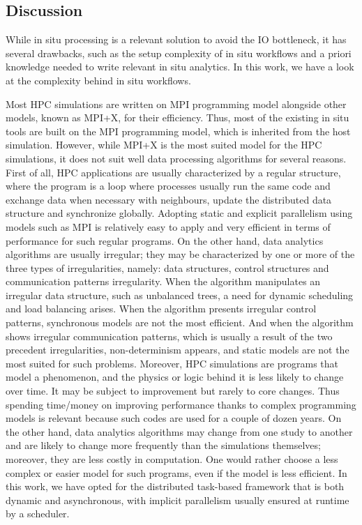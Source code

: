 \subsection{Discussion}\label{sec:discussion:programmingmodels}

While in situ processing is a relevant solution to avoid the IO bottleneck, it has several drawbacks, such as the setup complexity of in situ workflows and a priori knowledge needed to write relevant in situ analytics. In this work, we  have a look at the complexity behind in situ workflows.  

Most HPC simulations are written on MPI programming model alongside other models, known as MPI+X, for their efficiency. Thus, most of the existing in situ tools are built on the MPI programming model, which is inherited from the host simulation. However, while MPI+X is the most suited model for the HPC simulations, it does not suit well data processing algorithms for several reasons.
First of all, HPC applications are usually characterized by a regular structure, where the program is a loop where processes usually run the same code and exchange data when necessary with neighbours, update the distributed data structure and synchronize globally. Adopting static and explicit parallelism using models such as MPI is relatively easy to apply and very efficient in terms of performance for such regular programs. 
On the other hand, data analytics algorithms are usually irregular; they may be characterized by one or more of the three types of irregularities, namely: data structures, control structures and communication patterns irregularity\cite{4919639}. When the algorithm manipulates an irregular data structure, such as unbalanced trees, a need for dynamic scheduling and load balancing arises. When the algorithm presents irregular control patterns, synchronous models are not the most efficient. And when the algorithm shows irregular communication patterns, which is usually a result of the two precedent irregularities, non-determinism appears, and static models are not the most suited for such problems. 
Moreover, HPC simulations are programs that model a phenomenon, and the physics or logic behind it is less likely to change over time. It may be subject to improvement but rarely to core changes. Thus spending time/money on improving performance thanks to complex programming models is relevant because such codes are used for a couple of dozen years.   
On the other hand, data analytics algorithms may change from one study to another and are likely to change more frequently than the simulations themselves; moreover, they are less costly in computation. One would rather choose a less complex or easier model for such programs, even if the model is less efficient. In this work, we have opted for the distributed task-based framework that is both dynamic and asynchronous, with implicit parallelism usually ensured at runtime by a scheduler.   

